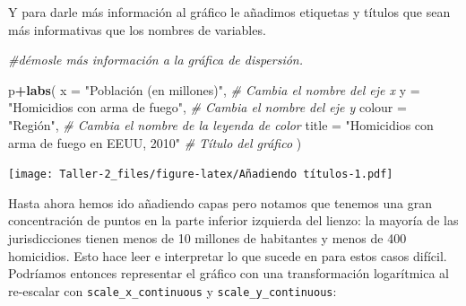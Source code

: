 \documentclass[
]{article}
\newenvironment{Shaded}{\begin{snugshade}}{\end{snugshade}}
\newcommand{\AttributeTok}[1]{\textcolor[rgb]{0.13,0.29,0.53}{#1}}
\newcommand{\CommentTok}[1]{\textcolor[rgb]{0.56,0.35,0.01}{\textit{#1}}}
\newcommand{\FunctionTok}[1]{\textcolor[rgb]{0.13,0.29,0.53}{\textbf{#1}}}
\newcommand{\NormalTok}[1]{#1}
\newcommand{\SpecialCharTok}[1]{\textcolor[rgb]{0.81,0.36,0.00}{\textbf{#1}}}
\newcommand{\StringTok}[1]{\textcolor[rgb]{0.31,0.60,0.02}{#1}}
\begin{document}
Y para darle más información al gráfico le añadimos etiquetas y títulos
que sean más informativas que los nombres de variables.

\begin{Shaded}
\begin{Highlighting}[]
\CommentTok{\#démosle más información a la gráfica de dispersión.}

\NormalTok{p}\SpecialCharTok{+}\FunctionTok{labs}\NormalTok{(}
  \AttributeTok{x =} \StringTok{"Población (en millones)"}\NormalTok{,   }\CommentTok{\# Cambia el nombre del eje x}
  \AttributeTok{y =} \StringTok{"Homicidios con arma de fuego"}\NormalTok{,            }\CommentTok{\# Cambia el nombre del eje y}
  \AttributeTok{colour =} \StringTok{"Región"}\NormalTok{,              }\CommentTok{\# Cambia el nombre de la leyenda de color}
  \AttributeTok{title =} \StringTok{"Homicidios con arma de fuego en EEUU, 2010"}  \CommentTok{\# Título del gráfico}
\NormalTok{)}
\end{Highlighting}
\end{Shaded}

\texttt{[image: Taller-2\_files/figure-latex/Añadiendo títulos-1.pdf]}

Hasta ahora hemos ido añadiendo capas pero notamos que tenemos una gran
concentración de puntos en la parte inferior izquierda del lienzo: la
mayoría de las jurisdicciones tienen menos de 10 millones de habitantes
y menos de 400 homicidios. Esto hace leer e interpretar lo que sucede en
para estos casos difícil. Podríamos entonces representar el gráfico con
una transformación logarítmica al re-escalar con
\texttt{scale\_x\_continuous} y \texttt{scale\_y\_continuous}:
\end{document}
